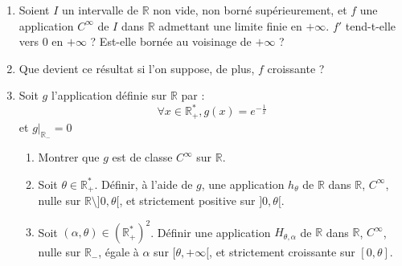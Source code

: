 
\begin{exer}
\begin{enumerate}
\item Soient $I$ un intervalle de $\mathbb{R}$ non vide, non borné supérieurement, %
et $f$ une application $C^{\infty}$ de $I$ dans $\mathbb{R}$ admettant une limite finie en $+ \infty$. %
$f'$ tend-t-elle vers $0$ en $+ \infty$ ? Est-elle bornée au voisinage de $+ \infty$ ?
\item Que devient ce résultat si l'on suppose, de plus, $f$ croissante ?
\item  Soit $g$ l'application définie sur $\mathbb{R}$ par :
\[\forall x \in \mathbb{R}_+^*, g(x) = e^{- \frac{1}{x}}\]
et $g|_{\mathbb{R}_-} = 0$
\begin{enumerate}
\item Montrer que $g$ est de classe $C^{\infty}$ sur $\mathbb{R}$.
\item Soit $\theta \in \mathbb{R}_+^*$. Définir, à l'aide de $g$, une application $h_{\theta}$ de $\mathbb{R}$ dans $\mathbb{R}$, $C^{\infty}$, nulle sur $\mathbb{R} \setminus ]0 , \theta[$, et strictement positive sur $]0 , \theta[$.
\item Soit $(\alpha , \theta) \in (\mathbb{R}_+^*)^2$. Définir une application $H_{\theta , \alpha}$ de $\mathbb{R}$ dans $\mathbb{R}$, $C^{\infty}$, nulle sur $\mathbb{R}_-$, égale à $\alpha$ sur $[ \theta , + \infty[$, et strictement croissante sur $[0, \theta]$.


\end{enumerate}
\end{enumerate}
\end{exer}
